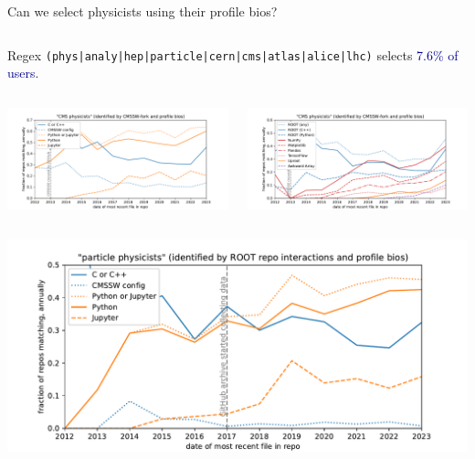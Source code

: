 \documentclass[aspectratio=169]{beamer}
\begin{document}
\begin{frame}{Can we select physicists using their profile bios?}
\vspace{0.15 cm}
\small
\begin{columns}
Regex \texttt{(phys|analy|hep|particle|cern|cms|atlas|alice|lhc)} selects \textcolor{darkblue}{7.6\% of users}.
\end{columns}

\begin{columns}
\includegraphics[width=\linewidth]{analysis/github-language-cmsswseed-tight-fraction.pdf}

\hspace{-0.25 cm}\includegraphics[width=\linewidth]{analysis/github-package-cmsswseed-tight-fraction.pdf}
\end{columns}

\vspace{-0.25 cm}
\begin{columns}
\includegraphics[width=\linewidth]{analysis/github-language-rootseed-tight-fraction.pdf}


\end{columns}
\end{frame}
\end{document}
